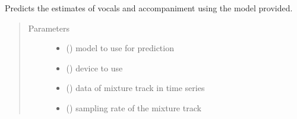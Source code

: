 \documentclass[letterpaper,10pt,english]{sphinxmanual}
\begin{document}

\begin{fulllineitems}
\label{\detokenize{docs/source/train:train.train_model.main}}
\end{fulllineitems}


\begin{fulllineitems}
\label{\detokenize{docs/source/train:train.train_model.predict}}
Predicts the estimates of vocals and accompaniment using the model provided.
\begin{quote}\begin{description}
\item[{Parameters}] \leavevmode\begin{itemize}
\item {} 
 ({\hyperref[\detokenize{docs/source/train:train.model.Generalised_Recurrent_Model}]{}}) \textendash{} model to use for prediction

\item {} 
 () \textendash{} device to use

\item {} 
 (\sphinxstyleliteralemphasis{\sphinxupquote{(}}\sphinxstyleliteralemphasis{\sphinxupquote{, }}\sphinxstyleliteralemphasis{\sphinxupquote{)}}) \textendash{} data of mixture track in time series

\item {} 
 () \textendash{} sampling rate of the mixture track


\end{itemize}
\end{description}
\end{quote}
\end{fulllineitems}
\end{document}
